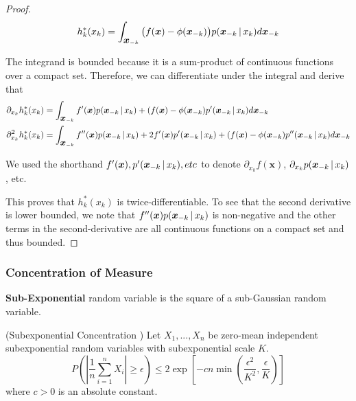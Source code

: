 \begin{proof}

\[
h^*_k(x_k) = \int_{\mbox{\boldmath $x$}_{-k}} \big(f(\mbox{\boldmath $x$}) - \phi(\mbox{\boldmath $x$}_{-k})\big) p(\mbox{\boldmath $x$}_{-k} {\,|\,} x_k) d \mbox{\boldmath $x$}_{-k}
\]

The integrand is bounded because it is a sum-product of continuous functions over a compact set. Therefore, we can differentiate under the integral and derive that
\begin{align*}
\partial_{x_k} h^*_k(x_k) &= 
    \int_{\mbox{\boldmath $x$}_{-k}} f'(\mbox{\boldmath $x$}) p(\mbox{\boldmath $x$}_{-k} {\,|\,} x_k) + (f(\mbox{\boldmath $x$}) - \phi(\mbox{\boldmath $x$}_{-k}) p'(\mbox{\boldmath $x$}_{-k} {\,|\,} x_k) d \mbox{\boldmath $x$}_{-k}\\
\partial_{x_k}^2 h^*_k(x_k) &= 
    \int_{\mbox{\boldmath $x$}_{-k}} f''(\mbox{\boldmath $x$}) p(\mbox{\boldmath $x$}_{-k} {\,|\,} x_k) + 2f'(\mbox{\boldmath $x$}) p'(\mbox{\boldmath $x$}_{-k} {\,|\,} x_k)  + (f(\mbox{\boldmath $x$}) - \phi(\mbox{\boldmath $x$}_{-k}) p''(\mbox{\boldmath $x$}_{-k} {\,|\,} x_k) d \mbox{\boldmath $x$}_{-k}
\end{align*}

We used the shorthand $f'(\mbox{\boldmath $x$}), p'(\mbox{\boldmath $x$}_{-k} {\,|\,} x_k), etc$ to denote $\partial_{x_k} f(\mathbf{x})$, $\partial_{x_k} p(\mbox{\boldmath $x$}_{-k} {\,|\,} x_k)$, etc. 

This proves that $h^*_k(x_k)$ is twice-differentiable. To see that the second derivative is lower bounded, we note that $f''(\mbox{\boldmath $x$}) p(\mbox{\boldmath $x$}_{-k} {\,|\,} x_k)$ is non-negative and the other terms in the second-derivative are all continuous functions on a compact set and thus bounded. 

\end{proof}


 \subsubsection{Concentration of Measure}

\textbf{Sub-Exponential} random variable is the square of a sub-Gaussian random variable\cite{vershynin2010introduction}.

\begin{proposition} (Subexponential Concentration \cite{vershynin2010introduction})
Let $X_1,...,X_n$ be zero-mean independent subexponential random variables with subexponential scale $K$. 
\[
P( | \frac{1}{n} \sum_{i=1}^n X_i | \geq \epsilon) \leq
	2 \exp \left[ -c n \min\left( \frac{\epsilon^2}{K^2}, \frac{\epsilon}{K} \right) \right]
\]
where $c > 0$ is an absolute constant.
\end{proposition}

